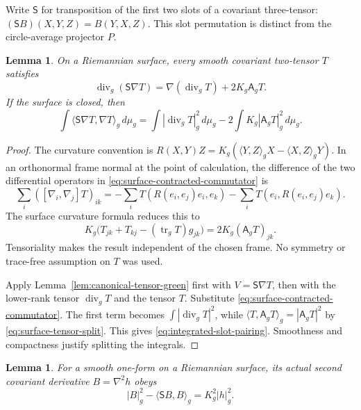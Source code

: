 \documentclass[11pt]{article}
\newtheorem{lemma}[theorem]{Lemma}
\begin{document}
Write $\mathsf S$ for transposition of the first two slots of a covariant
three-tensor: $(\mathsf S B)(X,Y,Z)=B(Y,X,Z)$. This slot permutation is
distinct from the circle-average projector $P$.

\begin{lemma}\label{lem:surface-contracted-commutator}
On a Riemannian surface, every smooth covariant two-tensor $T$ satisfies
\begin{equation}\label{eq:surface-contracted-commutator}
 \operatorname{div}_g(\mathsf S\nabla T)
    =\nabla(\operatorname{div}_gT)+2K_g\mathsf A_gT.
\end{equation}
If the surface is closed, then
\begin{equation}\label{eq:integrated-slot-pairing}
 \int\langle\mathsf S\nabla T,\nabla T\rangle_g\,d\mu_g
   =\int|\operatorname{div}_gT|_g^2\,d\mu_g
       -2\int K_g|\mathsf A_gT|_g^2\,d\mu_g.
\end{equation}
\end{lemma}

\begin{proof}
The curvature convention is
$R(X,Y)Z=K_g(\langle Y,Z\rangle_gX-\langle X,Z\rangle_gY)$.
In an orthonormal frame normal at the point of calculation, the difference
of the two differential operators in \eqref{eq:surface-contracted-commutator} is
\[
 \sum_i([\nabla_i,\nabla_j]T)_{ik}
 =-\sum_i T(R(e_i,e_j)e_i,e_k)-\sum_i T(e_i,R(e_i,e_j)e_k).
\]
The surface curvature formula reduces this to
\[
 K_g\bigl(T_{jk}+T_{kj}-(\operatorname{tr}_gT)g_{jk}\bigr)
       =2K_g(\mathsf A_gT)_{jk}.
\]
Tensoriality makes the result independent of the chosen frame. No symmetry
or trace-free assumption on $T$ was used.

Apply Lemma~\ref{lem:canonical-tensor-green} first with $V=\mathsf S\nabla T$,
then with the lower-rank tensor $\operatorname{div}_gT$ and the tensor $T$.
Substitute \eqref{eq:surface-contracted-commutator}. The first term becomes
$\int|\operatorname{div}_gT|^2$, while
$\langle T,\mathsf A_gT\rangle_g=|\mathsf A_gT|^2$ by
\eqref{eq:surface-tensor-split}. This gives \eqref{eq:integrated-slot-pairing}.
Smoothness and compactness justify splitting the integrals.
\end{proof}

\begin{lemma}\label{lem:one-form-skew-pairing}
For a smooth one-form on a Riemannian surface, its actual second covariant
derivative $B=\nabla^2h$ obeys
\[
 |B|_g^2-\langle\mathsf S B,B\rangle_g=K_g^2|h|_g^2.
\]
\end{lemma}
\end{document}
